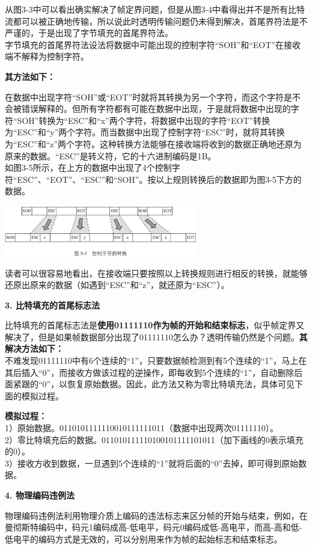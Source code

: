 从图3-3中可以看出确实解决了帧定界问题，但是从图3-4中看得出并不是所有比特流都可以被正确地传输，所以说此时透明传输问题仍未得到解决，首尾界符法是不严谨的，于是出现了字节填充的首尾界符法。\\
字节填充的首尾界符法设法将数据中可能出现的控制字符``SOH''{和``EOT''在接收端不解释为控制字符。}

\textbf{其方法如下：}

在数据中出现字符``SOH''或``EOT''时就将其转换为另一个字符，而这个字符是不会被错误解释的。但所有字符都有可能在数据中出现，于是就将数据中出现的字符``SOH''转换为``ESC''和``x''两个字符，将数据中出现的字符``EOT''转换为``ESC''和``y''两个字符。而当数据中出现了控制字符``ESC''时，就将其转换为``ESC''和``z''两个字符。这种转换方法能够在接收端将收到的数据正确地还原为原来的数据。``ESC''是转义符，它的十六进制编码是1B。\\
如图3-5所示，在上方的数据中出现了4个控制字符``ESC''、``EOT''、``ESC''和``SOH''。按以上规则转换后的数据即为图3-5下方的数据。

\includegraphics[width=3.33333in,height=0.87500in]{png-jpeg-pics/47B60388BAD2BCBCFD0ACE2224A9BF28.png}

读者可以很容易地看出，在接收端只要按照以上转换规则进行相反的转换，就能够还原出原来的数据（如遇到``ESC''和``z''，就还原为``ESC''）。

\textbf{{3. 比特填充的首尾标志法}}

比特填充的首尾标志法是{\textbf{使用01111110作为帧的开始和结束标志}}，似乎帧定界又解决了，但是如果帧数据部分出现了01111110怎么办？透明传输仍然是个问题。\textbf{其解决方法如下：}\\
不难发现01111110中有6个连续的``1''，只要数据帧检测到有5个连续的``1''，马上在其后插入``0''，而接收方做该过程的逆操作，即每收到5个连续的``1''，自动删除后面紧跟的``0''，以恢复原始数据。因此，此方法又称为零比特填充法，具体可见下面的模拟过程。

\textbf{模拟过程：}\\
1）原始数据。0110101111110010111111011（数据中出现两次01111110）。\\
2）零比特填充后的数据。011010111110100101111101011（加下画线的0表示填充的0）。\\
3）接收方收到数据，一旦遇到5个连续的``1''就将后面的``0''去掉，即可得到原始数据。

\textbf{{4. 物理编码违例法}}

物理编码违例法利用物理介质上编码的违法标志来区分帧的开始与结束，例如，在曼彻斯特编码中，码元1编码成高-低电平，码元0编码成低-高电平，而高-高和低-低电平的编码方式是无效的，可以分别用来作为帧的起始标志和结束标志。
